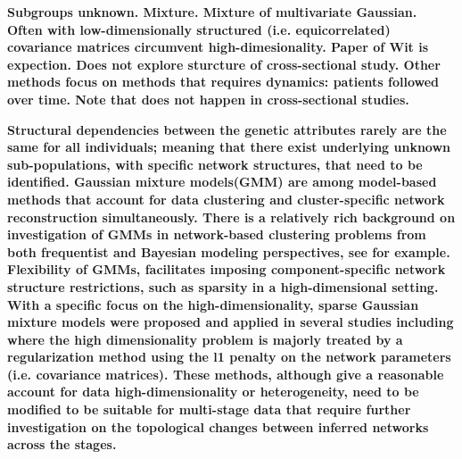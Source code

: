 \documentclass[10pt]{article}
\begin{document}
\textbf{Subgroups unknown. Mixture. Mixture of multivariate Gaussian. Often with low-dimensionally structured (i.e. equicorrelated) covariance matrices circumvent high-dimesionality. Paper of Wit is expection. Does not explore sturcture of cross-sectional study. Other methods focus on methods that requires dynamics: patients followed over time. Note that does not happen in cross-sectional studies.}

\textbf{Structural dependencies between the genetic attributes rarely are the same for all individuals; meaning that there exist underlying unknown sub-populations, with specific network structures, that need to be identified. Gaussian mixture models(GMM) are among model-based methods that account for data clustering and cluster-specific network reconstruction simultaneously. There is a relatively rich background on investigation of GMMs in network-based clustering problems from both frequentist and Bayesian modeling perspectives, see for example\citet{roberts1998,fraley2002,nasios2006,mcnicholas2008, mcnicholas2010}. Flexibility of GMMs, facilitates imposing component-specific network structure restrictions, such as sparsity in a high-dimensional setting. With a specific focus on the high-dimensionality, sparse Gaussian mixture models were proposed and applied in several studies including \citet{raftery2006variable,pan2007penalized,maugis2009,maugis2011non,ruan2011,lotsi2013,hill2013,azizyan2015} where the high dimensionality problem is majorly treated by a regularization method using the l1 penalty on the network parameters (i.e. covariance matrices). These methods, although give a reasonable account for data high-dimensionality or heterogeneity, need to be modified to be suitable for multi-stage data that require further investigation on the topological changes between inferred networks across the stages.}
\end{document}

